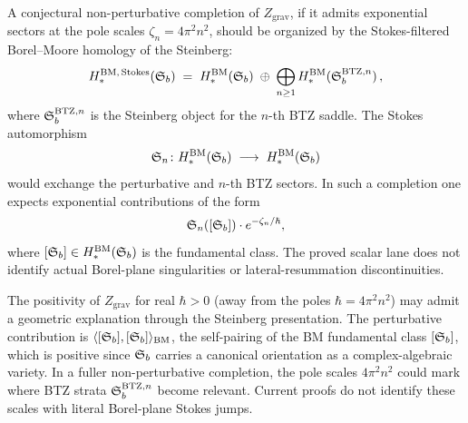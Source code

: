 \begin{conjecture}
A conjectural non-perturbative completion of $Z_{\mathrm{grav}}$, if it
admits exponential sectors at the pole scales $\zeta_n = 4\pi^2 n^2$,
should be organized by the Stokes-filtered Borel--Moore homology of the
Steinberg:
\begin{equation}%
H_*^{\mathrm{BM},\,\mathrm{Stokes}}(\SteinbergB) \;=\; H_*^{\mathrm{BM}}(\SteinbergB) \;\oplus\; \bigoplus_{n \geq 1} H_*^{\mathrm{BM}}(\SteinbergB^{\mathrm{BTZ},n})\,,
\end{equation}
where $\mathfrak{S}_b^{\mathrm{BTZ},n}$ is the Steinberg object for the $n$-th BTZ saddle. The Stokes automorphism
\[
\mathfrak{S}_n \colon H_*^{\mathrm{BM}}(\mathfrak{S}_b) \;\longrightarrow\; H_*^{\mathrm{BM}}(\mathfrak{S}_b)
\]
would exchange the perturbative and $n$-th BTZ sectors. In such a
completion one expects exponential contributions of the form
\[
\mathfrak{S}_n([\mathfrak{S}_b]) \cdot e^{-\zeta_n / \hbar},
\]
where $[\mathfrak{S}_b] \in H_*^{\mathrm{BM}}(\mathfrak{S}_b)$ is the
fundamental class. The proved scalar lane does not identify actual
Borel-plane singularities or lateral-resummation discontinuities.
\end{conjecture}

\begin{remark}
The positivity of $Z_{\mathrm{grav}}$ for real $\hbar > 0$ (away from
the poles $\hbar = 4\pi^2 n^2$) may admit a geometric explanation
through the Steinberg presentation. The perturbative contribution is
$\langle [\mathfrak{S}_b], [\mathfrak{S}_b] \rangle_{\mathrm{BM}}$, the
self-pairing of the BM fundamental class $[\mathfrak{S}_b]$, which is
positive since $\mathfrak{S}_b$ carries a canonical orientation as a
complex-algebraic variety. In a fuller non-perturbative completion, the
pole scales $4\pi^2 n^2$ could mark where BTZ strata
$\mathfrak{S}_b^{\mathrm{BTZ},n}$ become relevant. Current proofs do not
identify these scales with literal Borel-plane Stokes jumps.
\end{remark}

